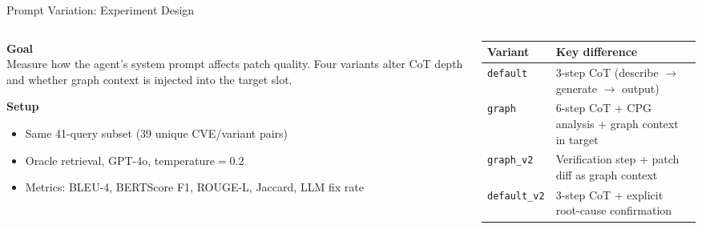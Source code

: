 \documentclass[aspectratio=169,10pt]{beamer}
\begin{document}
\begin{frame}{Prompt Variation: Experiment Design}
  \begin{columns}[T]
    \begin{column}{0.52\textwidth}
      \textbf{\textcolor{c1}{Goal}}\\[3pt]
      Measure how the agent's system prompt affects patch quality.
      Four variants alter CoT depth and whether graph context is
      injected into the target slot.

      \vspace{0.6em}
      \textbf{\textcolor{c3}{Setup}}\\[3pt]
      \begin{itemize}\setlength{\itemsep}{2pt}
        \item Same 41-query subset (39 unique CVE/variant pairs)
        \item Oracle retrieval, GPT-4o, temperature$=$0.2
        \item Metrics: BLEU-4, BERTScore F1, ROUGE-L, Jaccard, LLM fix rate
      \end{itemize}
    \end{column}
    \begin{column}{0.45\textwidth}
      {\scriptsize
      \renewcommand{\arraystretch}{1.2}
      \setlength{\tabcolsep}{2.5pt}
      \begin{tabular}{l p{4.0cm}}
        \toprule
        \textbf{Variant} & \textbf{Key difference} \\
        \midrule
        \texttt{default}
          & 3-step CoT (describe $\to$ generate $\to$ output) \\
        \texttt{graph}
          & 6-step CoT + CPG analysis + graph context in target \\
        \texttt{graph\_v2}
          & Verification step + patch diff as graph context \\
        \texttt{default\_v2}
          & 3-step CoT + explicit root-cause confirmation \\
        \bottomrule
      \end{tabular}}
    \end{column}
  \end{columns}
\end{frame}
\end{document}
